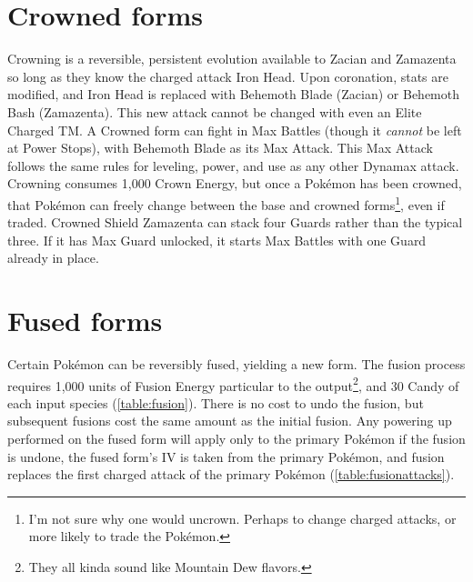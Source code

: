 \section{Crowned forms}
\label{sec:crowned}
Crowning is a reversible, persistent evolution available to Zacian and Zamazenta
 so long as they know the charged attack Iron Head.
Upon coronation, stats are modified, and Iron Head is replaced with Behemoth Blade (Zacian)
  or Behemoth Bash (Zamazenta).
This new attack cannot be changed with even an Elite Charged TM\@.
A Crowned form can fight in Max Battles (though it \textit{cannot} be left at Power Stops), with Behemoth Blade as its Max Attack.
This Max Attack follows the same rules for leveling, power, and use as any other Dynamax attack.
Crowning consumes 1,000 Crown Energy, but once a Pokémon has been crowned,
  that Pokémon can freely change between the base and crowned
  forms\footnote{I'm not sure why one would uncrown. Perhaps to change charged attacks,
    or more likely to trade the Pokémon.}, even if traded.
Crowned Shield Zamazenta can stack four Guards rather than the typical three.
If it has Max Guard unlocked, it starts Max Battles with one Guard already in place.



\section{Fused forms}
\label{sec:fusion}
Certain Pokémon can be reversibly fused, yielding a new form.
The fusion process requires 1,000 units of Fusion Energy particular to the output\footnote{They all kinda sound like Mountain Dew flavors.},
 and 30 Candy of each input species (\autoref{table:fusion}).
There is no cost to undo the fusion, but subsequent fusions cost the same amount as the initial fusion.
Any powering up performed on the fused form will apply only to the primary
  Pokémon if the fusion is undone, the fused form's IV is taken from the primary Pokémon,
  and fusion replaces the first charged attack of the primary Pokémon (\autoref{table:fusionattacks}).

